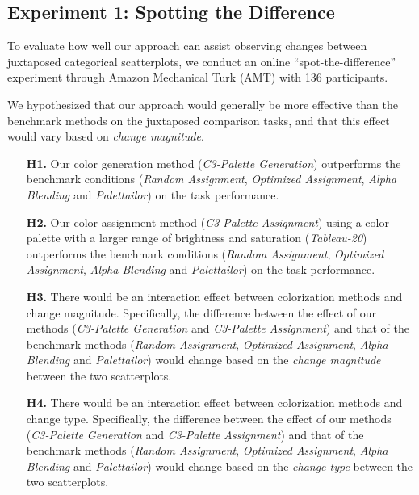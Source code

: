 \subsection{Experiment 1: Spotting the Difference}
\label{subsec:onlinestudy1}

To evaluate how well our approach can assist observing changes between juxtaposed categorical scatterplots, we conduct an online ``spot-the-difference'' experiment through Amazon Mechanical Turk (AMT) with 136 participants.

\vspace{.3em}
 We hypothesized that our approach would generally be more effective than the benchmark methods on the juxtaposed comparison tasks, and that this effect would vary based on \emph{change magnitude}.
\begin{itemize}[noitemsep]
\setlength{\itemsep}{5pt}
    \item[\textbf{H1.}] Our color generation method (\emph{C3-Palette Generation}) outperforms the benchmark conditions (\emph{Random Assignment}, \emph{Optimized Assignment}, \emph{Alpha Blending} and \emph{Palettailor}) on the task performance.

    \item [\textbf{H2.}] Our color assignment method (\emph{C3-Palette Assignment}) using a color palette with a larger range of brightness and saturation (\emph{Tableau-20}) outperforms the benchmark conditions (\emph{Random Assignment}, \emph{Optimized Assignment}, \emph{Alpha Blending} and \emph{Palettailor}) on the task performance.

    \item [\textbf{H3.}] There would be an interaction effect between colorization methods and change magnitude. Specifically, the difference between the effect of our methods (\emph{C3-Palette Generation} and \emph{C3-Palette Assignment}) and that of the benchmark methods (\emph{Random Assignment}, \emph{Optimized Assignment}, \emph{Alpha Blending} and \emph{Palettailor}) would change based on the \emph{change magnitude} between the two scatterplots.

    \item [\textbf{H4.}] There would be an interaction effect between colorization methods and change type. Specifically, the difference between the effect of our methods (\emph{C3-Palette Generation} and \emph{C3-Palette Assignment}) and that of the benchmark methods (\emph{Random Assignment}, \emph{Optimized Assignment}, \emph{Alpha Blending} and \emph{Palettailor}) would change based on the \emph{change type} between the two scatterplots.
\end{itemize}

